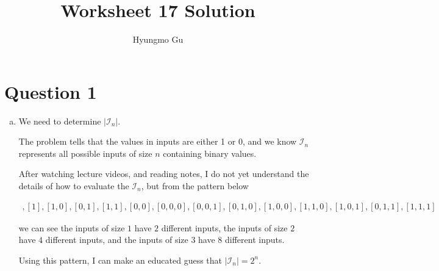 \documentclass[12pt]{article}
\begin{document}
\title{Worksheet 17 Solution}
\author{Hyungmo Gu}
\maketitle

\section*{Question 1}
\begin{enumerate}[a.]
    \item

    We need to determine $\lvert \mathcal{I}_n \rvert$.

    \bigskip

    The problem tells that the values in inputs are either 1 or 0, and we know
    $\mathcal{I}_n$ represents all possible inputs of size $n$ containing binary values.

    \bigskip

    After watching lecture videos, and reading notes, I do not yet understand the details
    of how to evaluate the $\mathcal{I}_n$, but from the pattern below

    \begin{align*}
        [0], [1], [1,0], [0,1], [1,1], [0,0], [0,0,0],[0,0,1],[0,1,0],[1,0,0],
        [1,1,0],[1,0,1],[0,1,1],[1,1,1]
    \end{align*}

    we can see the inputs of size $1$ have $2$ different inputs, the inputs of size $2$ have $4$
    different inputs, and the inputs of size $3$ have $8$ different inputs.

    \bigskip

    Using this pattern, I can make an educated guess that $\lvert \mathcal{I}_n \rvert = 2^n$.


\end{enumerate}
\end{document}
